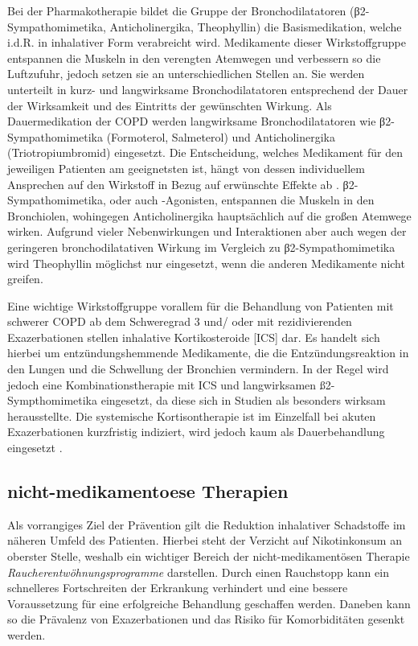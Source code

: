 Bei der Pharmakotherapie bildet die Gruppe der Bronchodilatatoren (β2-Sympathomimetika, Anticholinergika, Theophyllin) die Basismedikation, welche i.d.R. in inhalativer Form verabreicht wird. Medikamente dieser Wirkstoffgruppe entspannen die Muskeln in den verengten Atemwegen und verbessern so die Luftzufuhr, jedoch setzen sie an unterschiedlichen Stellen an. Sie werden unterteilt in kurz- und langwirksame Bronchodilatatoren entsprechend der Dauer der Wirksamkeit und des Eintritts der gewünschten Wirkung. Als Dauermedikation der COPD werden langwirksame Bronchodilatatoren wie β2-Sympathomimetika (Formoterol, Salmeterol) und Anticholinergika (Triotropiumbromid) eingesetzt. Die Entscheidung, welches Medikament für den jeweiligen Patienten am geeignetsten ist, hängt von dessen individuellem Ansprechen auf den Wirkstoff in Bezug auf erwünschte Effekte ab \autocite[vgl.][e13]{vogelmeier2007}. β2-Sympathomimetika, oder auch -Agonisten, entspannen die Muskeln in den Bronchiolen, wohingegen Anticholinergika hauptsächlich auf die großen Atemwege wirken. Aufgrund vieler Nebenwirkungen und Interaktionen aber auch wegen der geringeren bronchodilatativen Wirkung im Vergleich zu β2-Sympathomimetika wird Theophyllin möglichst nur eingesetzt, wenn die anderen Medikamente nicht greifen. 

Eine wichtige Wirkstoffgruppe vorallem für die Behandlung von Patienten mit schwerer COPD ab dem Schweregrad 3 und/ oder mit rezidivierenden Exazerbationen stellen inhalative Kortikosteroide [ICS] dar. Es handelt sich hierbei um entzündungshemmende Medikamente, die die Entzündungsreaktion in den Lungen und die Schwellung der Bronchien vermindern. In der Regel wird jedoch eine Kombinationstherapie mit ICS und langwirksamen ß2-Sympthomimetika eingesetzt, da diese sich in Studien als besonders wirksam herausstellte. Die systemische Kortisontherapie ist im Einzelfall bei akuten Exazerbationen kurzfristig indiziert, wird jedoch kaum als Dauerbehandlung eingesetzt \autocite[vgl.][249f., 253]{gillissen2007}.

\subsection{nicht-medikamentoese Therapien}
\label{nicht-medikamentoese therapien}
Als vorrangiges Ziel der Prävention gilt die Reduktion inhalativer Schadstoffe im näheren Umfeld des Patienten. Hierbei steht der Verzicht auf Nikotinkonsum an oberster Stelle, weshalb ein wichtiger Bereich der nicht-medikamentösen Therapie \emph{Raucherentwöhnungsprogramme} darstellen. Durch einen Rauchstopp kann ein schnelleres Fortschreiten der Erkrankung verhindert und eine bessere Voraussetzung für eine erfolgreiche Behandlung geschaffen werden. Daneben kann so die Prävalenz von Exazerbationen und das Risiko für Komorbiditäten gesenkt werden.


